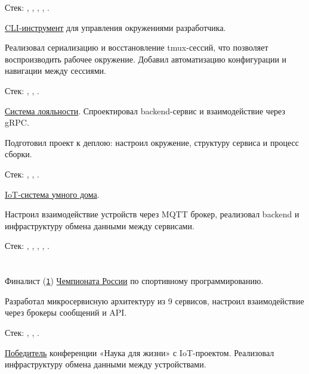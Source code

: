 \documentclass[margin,line]{resume}
\begin{document}
\begin{resume}
\begin{description}[leftmargin=0pt, itemindent=*, itemsep=8pt]
      Стек: , ,
      , , .

    \item[lazy-tmux:]
      \href{https://lazy-tmux.xyz}{CLI-инструмент}
      для управления окружениями разработчика.

      Реализовал сериализацию и восстановление tmux-сессий,
      что позволяет воспроизводить рабочее окружение.
      Добавил автоматизацию конфигурации и навигации между сессиями.

      Стек: , , .

    \item[Ballkit:]
      \href{https://github.com/ballkit}{Система лояльности}.
      Спроектировал backend-сервис и взаимодействие через gRPC.

      Подготовил проект к деплою: настроил окружение,
      структуру сервиса и процесс сборки.

      Стек: , , .

    \item[SmartCab:]
      \href{https://github.com/smart-cab}{IoT-система умного дома}.

      Настроил взаимодействие устройств через MQTT брокер,
      реализовал backend и инфраструктуру обмена данными между сервисами.

      Стек: , ,
      , , .

  \end{description}

  \section{}
  Финалист
  (\href{https://alchemmist.github.io/CV/attachments/russian-chemp-final.pdf}{\texttt{1}})
  \href{https://events.fsp-russia.com/championship}{Чемпионата
  России} по спортивному программированию.

  Разработал микросервисную архитектуру из 9 сервисов,
  настроил взаимодействие через брокеры сообщений и API.

  Стек:
  , , .

  \href{https://alchemmist.github.io/CV/attachments/scince-for-life-win.pdf}{Победитель}
  конференции «Наука для жизни» с IoT-проектом.
  Реализовал инфраструктуру обмена данными между устройствами.


\end{resume}
\end{document}
